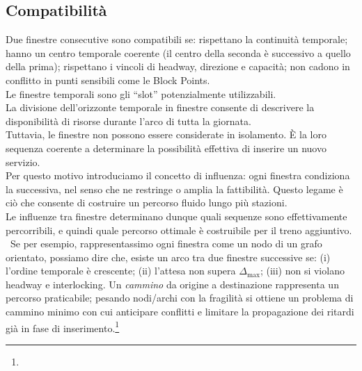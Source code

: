 \documentclass{report}
\newcommand{\fnShort}[2][]{\footnote{\footshorthand[#1]{#2}}}
\begin{document}
\subsection{Compatibilità}

Due finestre consecutive sono compatibili se: rispettano la continuità temporale; hanno un centro temporale coerente (il centro della seconda è successivo a quello della prima); rispettano i vincoli di headway, direzione e capacità; non cadono in conflitto in punti sensibili come le Block Points. \\ Le finestre temporali sono gli “slot” potenzialmente utilizzabili. \\ La divisione dell’orizzonte temporale in finestre consente di descrivere la disponibilità di risorse durante l'arco di tutta la giornata. \\ 
Tuttavia, le finestre non possono essere considerate in isolamento. È la loro sequenza coerente a determinare la possibilità effettiva di inserire un nuovo servizio. \\ Per questo motivo introduciamo il concetto di influenza: ogni finestra condiziona la successiva, nel senso che ne restringe o amplia la fattibilità. Questo legame è ciò che consente di costruire un percorso fluido lungo più stazioni. \\ Le influenze tra finestre determinano dunque quali sequenze sono effettivamente percorribili, e quindi quale percorso ottimale è costruibile per il treno aggiuntivo. \\ \ Se per esempio, rappresentassimo ogni finestra come un nodo di un grafo orientato, possiamo dire che, esiste un arco tra due finestre successive se: (i) l’ordine temporale è crescente; (ii) l’attesa non supera $\Delta_{\max}$; (iii) non si violano headway e interlocking. Un \emph{cammino} da origine a destinazione rappresenta un percorso praticabile; pesando nodi/archi con la fragilità si ottiene un problema di cammino minimo con cui anticipare conflitti e limitare la propagazione dei ritardi già in fase di inserimento.\fnShort{DAriano2009}
\end{document}
